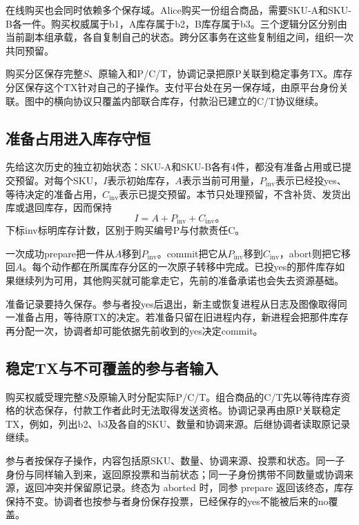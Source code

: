 在线购买也会同时依赖多个保存域。Alice购买一份组合商品，需要SKU-A和SKU-B各一件。购买权威属于b1，A库存属于b2，B库存属于b3。三个逻辑分区分别由当前副本组承载，各自复制自己的状态。跨分区事务在这些复制组之间，组织一次共同预留。


购买分区保存完整$S$、原输入和P/C/T，协调记录把原P关联到稳定事务TX。库存分区保存这个TX针对自己的子操作。支付平台处在另一保存域，由原平台身份关联。图中的横向协议只覆盖内部联合库存，付款沿已建立的C/T协议继续。

\subsection{准备占用进入库存守恒}

先给这次历史的独立初始状态：SKU-A和SKU-B各有4件，都没有准备占用或已提交预留。对每个SKU，$I$表示初始库存，$A$表示当前可用量，$P_{\mathrm{inv}}$表示已经投yes、等待决定的准备占用，$C_{\mathrm{inv}}$表示已提交预留。本节只处理预留，不含补货、发货出库或退回库存，因而保持
\[
I=A+P_{\mathrm{inv}}+C_{\mathrm{inv}}\text{。}
\]
下标inv标明库存计数，区别于购买编号P与付款责任C。

一次成功prepare把一件从$A$移到$P_{\mathrm{inv}}$。commit把它从$P_{\mathrm{inv}}$移到$C_{\mathrm{inv}}$，abort则把它移回$A$。每个动作都在所属库存分区的一次原子转移中完成。已投yes的那件库存如果继续列为可用，其他购买就可能拿走它，先前的准备承诺也会失去资源基础。


准备记录要持久保存。参与者投yes后退出，新主或恢复进程从日志及图像取得同一准备占用，等待原TX的决定。若准备只留在旧进程内存，新进程会把那件库存再分配一次，协调者却可能依据先前收到的yes决定commit。

\subsection{稳定TX与不可覆盖的参与者输入}

购买权威受理完整$S$及原输入时分配实际P/C/T。组合商品的C/T先以等待库存资格的状态保存，付款工作者此时无法取得发送资格。协调记录再由原P关联稳定TX，例如，列出b2、b3及各自的SKU、数量和协调来源。后继协调者读取原记录继续。

参与者按保存子操作，内容包括原SKU、数量、协调来源、投票和状态。同一子身份与同样输入到来，返回原投票和当前状态；同一子身份携带不同数量或协调来源，返回冲突并保留原记录。终态为 aborted 时，同参 prepare 返回该终态，库存保持不变。协调者也按参与者身份保存投票，已经保存的yes不能被后来的no覆盖。

